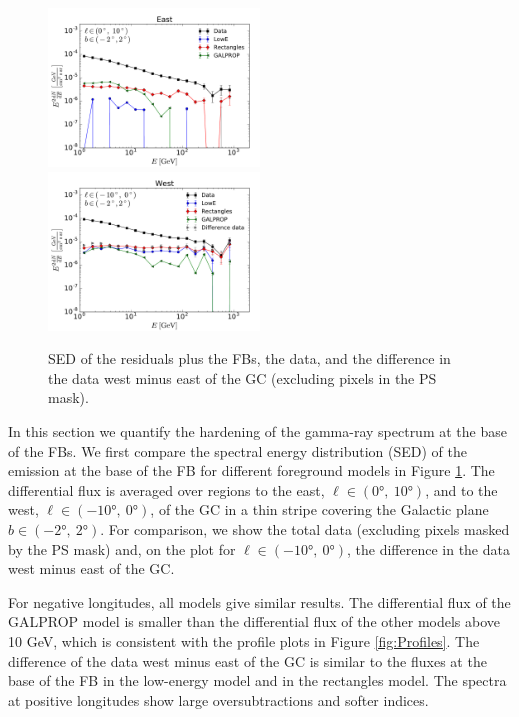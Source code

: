 \begin{figure}[h]
\includegraphics[width=0.5\textwidth]{plots/SED_all_models_source_l=5_b=0.pdf}
\includegraphics[width=0.5\textwidth]{plots/SED_all_models_source_l=-5_b=0.pdf}
  	\caption{SED of the residuals plus the FBs, the data, and the difference in the data west minus east of the GC (excluding pixels in the PS mask). 
	}
  	\label{fig:SED_all}
\end{figure}

In this section we quantify the hardening of the gamma-ray spectrum at the base of the FBs. 
We first compare the spectral energy distribution (SED) of the emission at the base of the FB for different foreground models in Figure \ref{fig:SED_all}. 
The differential flux is averaged over regions to the east, $\ell \in (\ang{0},\ \ang{10})$, and to the west, $\ell \in (\ang{-10},\ \ang{0})$, of the GC
in a thin stripe covering the Galactic plane $b \in (\ang{-2},\ \ang{2})$. 
For comparison, we show the total data (excluding pixels masked by the PS mask) and, on the plot for $\ell \in (\ang{-10},\ \ang{0})$, the difference in the data west minus east
of the GC.

For negative longitudes, all models give similar results. 
The differential flux of the GALPROP model is smaller than the differential flux of the other models above 10 GeV, 
which is consistent with the profile plots in Figure \ref{fig:Profiles}.
The difference of the data west minus east of the GC is similar to the fluxes at the base of the FB in the low-energy model and in the rectangles model. 
The spectra at positive longitudes show large oversubtractions and softer indices. 

